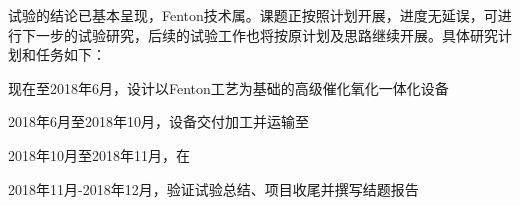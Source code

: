 试验的结论已基本呈现，Fenton技术属。课题正按照计划开展，进度无延误，可进行下一步的试验研究，后续的试验工作也将按原计划及思路继续开展。具体研究计划和任务如下：\par
现在至2018年6月，设计以Fenton工艺为基础的高级催化氧化一体化设备\par
2018年6月至2018年10月，设备交付加工并运输至\par
2018年10月至2018年11月，在\par
2018年11月-2018年12月，验证试验总结、项目收尾并撰写结题报告\par